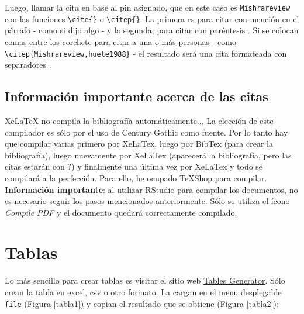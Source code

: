 \documentclass[11pt,]{article}
\begin{document}
\clearpage

Luego, llamar la cita en base al pin asignado, que en este caso es \verb!Mishrareview! con las funciones \verb!\cite{}! o \verb!\citep{}!. La primera es para citar con mención en el párrafo - como si \cite{Mishrareview} dijo algo - y la segunda; para citar con paréntesis \citep{Mishrareview}. Si se colocan comas entre los corchete para citar a una o más personas - como \verb!\citep{Mishrareview,huete1988}! - el resultado será una cita formateada con separadores \citep{Mishrareview,huete1988}.\\

\subsection{Información importante acerca de las citas\\}

XeLaTeX no compila la bibliografía automáticamente... La elección de este compilador es sólo por el uso de Century Gothic como fuente. Por lo tanto hay que compilar varias primero por XeLaTex, luego por BibTex (para crear la bibliografía), luego nuevamente por XeLaTex (aparecerá la bibliografía, pero las citas estarán con ?) y finalmente una última vez por XeLaTex y todo se compilará a la perfección. Para ello, he ocupado TeXShop para compilar.\\

\textbf{Información importante}: al utilizar RStudio para compilar los documentos, no es necesario seguir los pasos mencionados anteriormente. Sólo se utiliza el ícono \textit{Compile PDF} y el documento quedará correctamente compilado.

\section{Tablas\\}

Lo más sencillo para crear tablas es visitar el sitio web \href{https://www.tablesgenerator.com/latex_tables}{Tables Generator}. Sólo crean la tabla en excel, csv o otro formato. La cargan en el menu desplegable \verb!file! (Figura \ref{tabla1}) y copian el resultado que se obtiene (Figura \ref{tabla2}):
\end{document}
